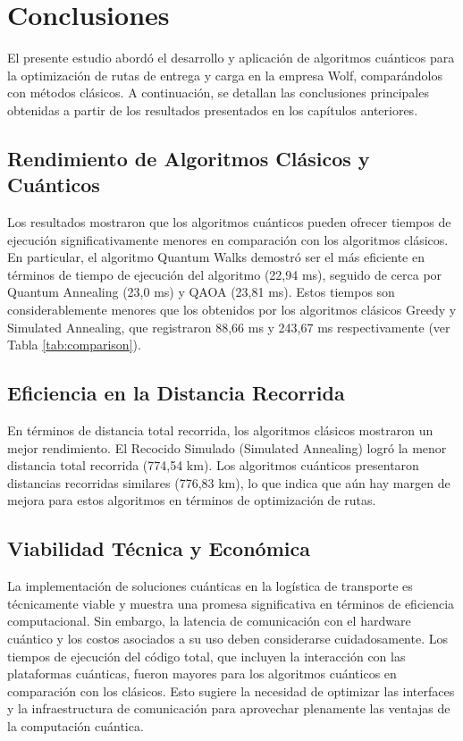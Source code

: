 \documentclass[11pt,a4paper,spanish]{book}
\begin{document}
\section{Conclusiones}

El presente estudio abordó el desarrollo y aplicación de algoritmos cuánticos para la optimización de rutas de entrega y carga en la empresa Wolf, comparándolos con métodos clásicos. A continuación, se detallan las conclusiones principales obtenidas a partir de los resultados presentados en los capítulos anteriores.

\subsection{Rendimiento de Algoritmos Clásicos y Cuánticos}

Los resultados mostraron que los algoritmos cuánticos pueden ofrecer tiempos de ejecución significativamente menores en comparación con los algoritmos clásicos. En particular, el algoritmo Quantum Walks demostró ser el más eficiente en términos de tiempo de ejecución del algoritmo (22,94 ms), seguido de cerca por Quantum Annealing (23,0 ms) y QAOA (23,81 ms). Estos tiempos son considerablemente menores que los obtenidos por los algoritmos clásicos Greedy y Simulated Annealing, que registraron 88,66 ms y 243,67 ms respectivamente (ver Tabla \ref{tab:comparison}).

\subsection{Eficiencia en la Distancia Recorrida}

En términos de distancia total recorrida, los algoritmos clásicos mostraron un mejor rendimiento. El Recocido Simulado (Simulated Annealing) logró la menor distancia total recorrida (774,54 km). Los algoritmos cuánticos presentaron distancias recorridas similares (776,83 km), lo que indica que aún hay margen de mejora para estos algoritmos en términos de optimización de rutas.

\subsection{Viabilidad Técnica y Económica}

La implementación de soluciones cuánticas en la logística de transporte es técnicamente viable y muestra una promesa significativa en términos de eficiencia computacional. Sin embargo, la latencia de comunicación con el hardware cuántico y los costos asociados a su uso deben considerarse cuidadosamente. Los tiempos de ejecución del código total, que incluyen la interacción con las plataformas cuánticas, fueron mayores para los algoritmos cuánticos en comparación con los clásicos. Esto sugiere la necesidad de optimizar las interfaces y la infraestructura de comunicación para aprovechar plenamente las ventajas de la computación cuántica.
\end{document}

